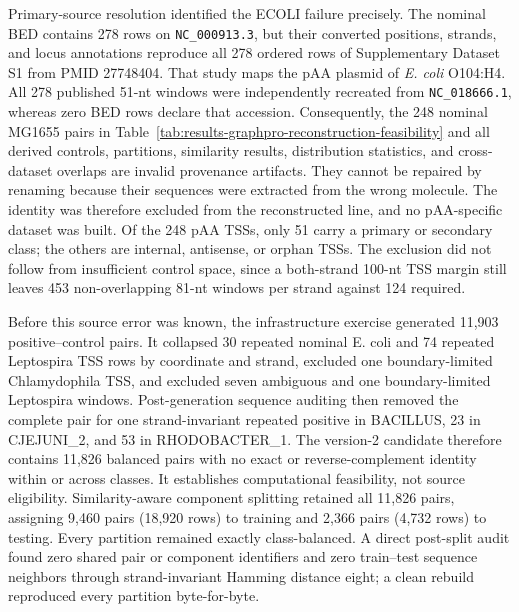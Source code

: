 Primary-source resolution identified the ECOLI failure precisely. The nominal
BED contains 278 rows on \texttt{NC\_000913.3}, but their converted positions,
strands, and locus annotations reproduce all 278 ordered rows of Supplementary
Dataset S1 from PMID 27748404. That study maps the pAA plasmid of
\textit{E. coli} O104:H4. All 278 published 51-nt windows were independently
recreated from \texttt{NC\_018666.1}, whereas zero BED rows declare that
accession. Consequently, the 248 nominal MG1655 pairs in
Table~\ref{tab:results-graphpro-reconstruction-feasibility} and all derived
controls, partitions, similarity results, distribution statistics, and
cross-dataset overlaps are invalid provenance artifacts. They cannot be
repaired by renaming because their sequences were extracted from the wrong
molecule. The identity was therefore excluded from the reconstructed line, and
no pAA-specific dataset was built. Of the 248 pAA TSSs, only 51 carry a primary
or secondary class; the others are internal, antisense, or orphan TSSs. The
exclusion did not follow from insufficient control space, since a
both-strand 100-nt TSS margin still leaves 453 non-overlapping 81-nt windows
per strand against 124 required.

Before this source error was known, the infrastructure exercise generated
11,903 positive--control pairs. It collapsed 30 repeated nominal E. coli and 74
repeated Leptospira TSS rows by coordinate and strand, excluded
one boundary-limited Chlamydophila TSS, and excluded seven ambiguous and one
boundary-limited Leptospira windows. Post-generation sequence auditing then
removed the complete pair for one strand-invariant repeated positive in
BACILLUS, 23 in CJEJUNI\_2, and 53 in RHODOBACTER\_1. The version-2 candidate
therefore contains 11,826 balanced pairs with no exact or reverse-complement
identity within or across classes. It establishes computational feasibility,
not source eligibility. Similarity-aware component splitting retained all
11,826 pairs, assigning 9,460 pairs (18,920 rows) to training and 2,366 pairs
(4,732 rows) to testing. Every partition remained exactly class-balanced. A
direct post-split audit found zero shared pair or component identifiers and zero
train--test sequence neighbors through strand-invariant Hamming distance eight;
a clean rebuild reproduced every partition byte-for-byte.


